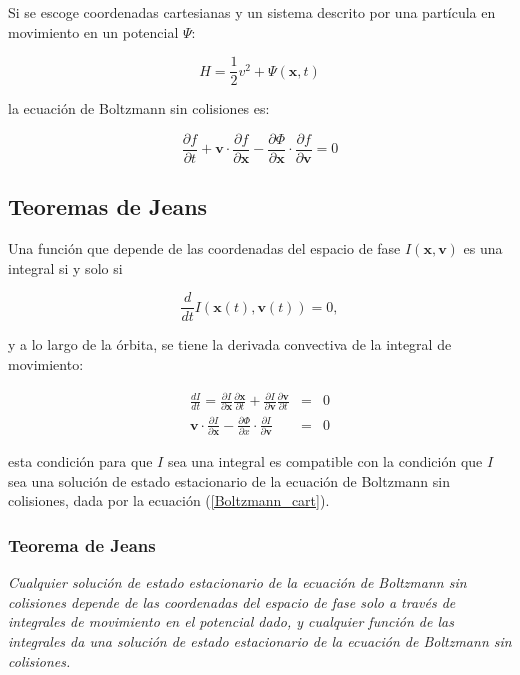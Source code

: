 Si se escoge coordenadas  cartesianas y un sistema descrito por una partícula en movimiento en un potencial $\Psi$:

\begin{equation}
\label{Hamiltonian_potential}
H = \frac{1}{2} v^2 + \Psi(\textbf{x}, t)
\end{equation}

la ecuación de Boltzmann sin colisiones es:

\begin{equation}
\label{Boltzmann_cart}
\frac{\partial f}{\partial t} + \textbf{v}\cdot \frac{\partial f}{\partial \textbf{x}} - \frac{\partial \Phi}{\partial \textbf{x}} \cdot \frac{\partial f}{\partial \textbf{v}} = 0
\end{equation}



\subsection{Teoremas de Jeans}

Una función que depende de las coordenadas del espacio de fase $I(\bm{x}, \bm{v})$ es una integral si y solo si

$$ \frac{d}{dt} I(\bm{x}(t), \bm{v}(t)) = 0, $$

y a lo largo de la órbita, se tiene la derivada convectiva de la integral de movimiento:

\begin{eqnarray}
\frac{d I}{dt} = \frac{\partial I}{\partial \bm{x}}  \frac{\partial \bm{x} }{\partial t } + \frac{\partial I}{\partial \bm{v}}  \frac{\partial \bm{v} }{\partial t } &=& 0 \\
\bm{v} \cdot \frac{\partial I}{\partial \bm{x}}   - \frac{\partial \Phi }{\partial x } \cdot  \frac{\partial I}{\partial \bm{v}}   &=& 0
\end{eqnarray}

esta condición para que $I$ sea una integral es compatible con la condición que $I$ sea una solución de estado estacionario de la ecuación de Boltzmann sin colisiones, dada por la ecuación (\ref{Boltzmann_cart}). \cite{BT08}

\subsubsection{Teorema de Jeans} \emph{Cualquier solución de estado estacionario de la ecuación de Boltzmann sin colisiones depende de las coordenadas del espacio de fase solo a través de integrales de movimiento en el potencial dado, y cualquier función de las integrales da una solución de estado estacionario de la ecuación de Boltzmann sin colisiones.}

